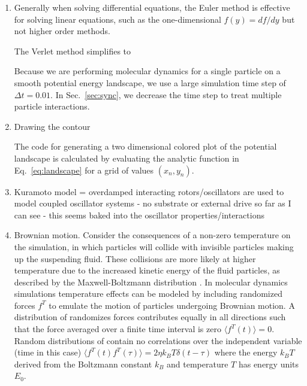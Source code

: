 \documentclass[twocolumn,preprintnumbers,amsmath,amssymb,aps,prx]{revtex4}
\begin{document}
\begin{enumerate}
\item
  Generally when solving differential equations,
  the Euler method is effective for solving linear equations,
  such as the one-dimensional 
  $f(y) = df/dy$ 
  but not higher order methods.

  The Verlet method simplifies to

  Because we are performing molecular dynamics
  for a single particle on a smooth potential energy landscape,
  we use a large simulation time step of 
  $\Delta t = 0.01$.
  In Sec.~\ref{sec:sync},
  we decrease the time step
  to treat multiple particle interactions.

  \label{ex:euler}

\item Drawing the contour

  The code for generating
a two dimensional colored plot
of the potential landscape
is calculated by evaluating
the analytic function in Eq.~\ref{eq:landscape}
for a grid of values $(x_n,y_n)$.
  
\item Kuramoto model = overdamped interacting rotors/oscillators are used to model coupled oscillator systems - no substrate or external drive so far as I can see - this seems baked into the oscillator properties/interactions

\item Brownian motion.  Consider the consequences of a non-zero temperature on the simulation, in which particles will collide with invisible particles making up the suspending fluid.  These collisions are more likely at higher temperature due to the increased kinetic energy of the fluid particles, as described by the Maxwell-Boltzmann distribution \cite{}.  In molecular dynamics simulations temperature effects can be modeled by including randomized forces $f^T$ to emulate the motion of particles undergoing Brownian motion.  A distribution of randomizes forces contributes equally in all directions such that the force averaged over a finite time interval is zero $\langle f^T(t) \rangle = 0$.  Random distributions of contain no correlations over the independent variable (time in this case) $\langle f^T(t) f^T(\tau)\rangle = 2 \eta k_B T \delta(t-\tau)$ where the energy $k_B T$ derived from the Boltzmann constant $k_B$ and temperature $T$ has energy units $E_0$.  \cite{Allen2017}


\end{enumerate}
\end{document}
